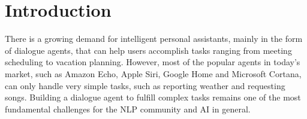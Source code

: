 \documentclass[11pt,letterpaper]{article}
\begin{document}


\section{Introduction}
There is a growing demand for intelligent personal assistants, mainly in the form of dialogue agents, that can help users accomplish tasks ranging from meeting scheduling to vacation planning. However, most of the popular agents in today's market, such as Amazon Echo, Apple Siri, Google Home and Microsoft Cortana, can only handle very simple tasks, such as reporting weather and requesting songs. Building a dialogue agent to fulfill complex tasks %
remains one of the most fundamental challenges for the NLP community and AI in general.

\end{document}
